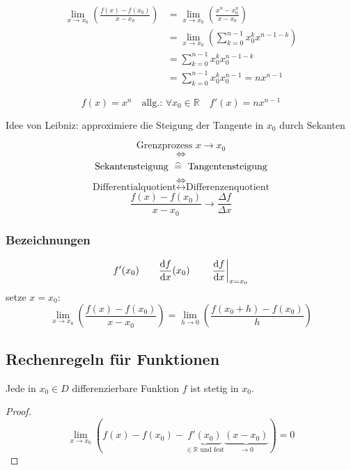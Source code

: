 \begin{example}[Einfache Differentiationsgleichung \( f(x)=x^n \)]
\begin{align*}
	\lim_{x \rightarrow x_0} \left(\frac{f(x)-f(x_0)}{x-x_0} \right)
	&= \lim_{x \rightarrow x_0} \left(\frac{x^n-x_0^n}{x-x_0}\right) \\
	&= \lim_{x \rightarrow x_0} \left(\sum_{k=0}^{n-1}x_0^kx^{n-1-k}\right) \\
	&= \sum_{k=0}^{n-1}x_0^kx_0^{n-1-k} \\
	&= \sum_{k=0}^{n-1}x_0^kx_0^{n-1} = nx^{n-1} 
\end{align*}

\[
	f(x)=x^n \quad \text{allg.: } \forall x_0 \in \mathbb{R} \quad f'(x)=nx^{n-1}
\]
\end{example}
\noindent Idee von Leibniz: approximiere die Steigung der Tangente in \( x_0 \) durch Sekanten

\[	\text{Grenzprozess } x \rightarrow x_0 \]
\[	\Leftrightarrow \]
\[	\text{Sekantensteigung } \mathrel{\widehat{=}} \text{ Tangentensteigung} \]
\[	\Leftrightarrow \]
\[	\text{Differentialquotient} \leftrightarrow \text{Differenzenquotient} \]
\[	\frac{f(x)-f(x_0)}{x-x_0} \rightarrow \frac{\Delta f}{\Delta x}\]

\subsubsection*{Bezeichnungen}
\begin{equation*}
	f'(x_0) \qquad \frac{\mathrm d f}{\mathrm d x}(x_0) \qquad \left.\frac{\mathrm d f}{\mathrm d x}\right|_{x=x_0}
\end{equation*}
%
setze \( x = x_0 \):
\begin{equation*}
  \lim_{x \rightarrow x_0}\left(\frac{f(x)-f(x_0)}{x-x_0}\right) = \lim_{h \rightarrow 0}\left(\frac{f(x_0+h)-f(x_0)}{h}\right)
\end{equation*}

\subsection{Rechenregeln für Funktionen}
\label{sec:rechenregeln_f_funktionen}

\begin{theorem}
  Jede in \( x_0 \in D \) differenzierbare Funktion \( f \) ist stetig in \( x_0\).
\end{theorem}
\begin{proof}
  \[ \lim_{x \rightarrow x_0} (f(x)-f(x_0)-\underbrace{f'(x_0)}_{\in \mathbb{R} \text{ und fest} }\underbrace{(x-x_0)}_{\longrightarrow 0}) = 0 \]
\end{proof}

